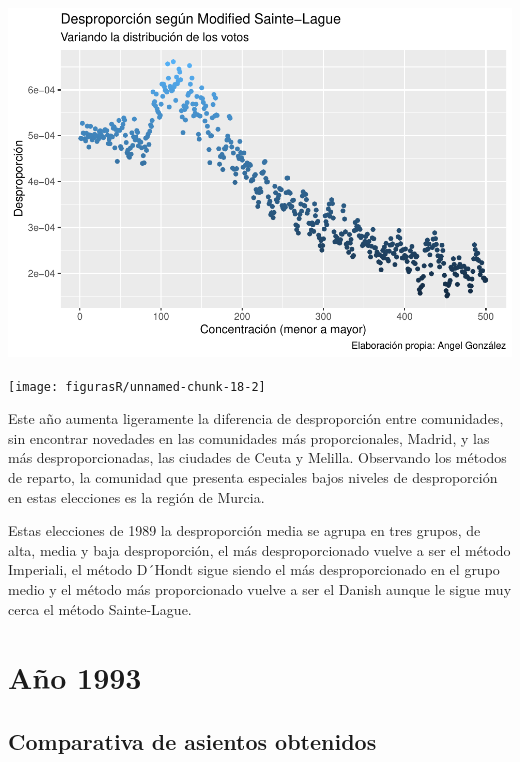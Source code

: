 \documentclass[12pt,a4paper,]{book}
\numberwithin{dummy}{section}
\theoremstyle{ocrenumbox}
\theoremstyle{blacknumex}
\theoremstyle{blacknumbox}
\theoremstyle{ocrenum}
\theoremstyle{ocrenum}
\begin{document}
\begin{center}\includegraphics[width=1\linewidth]{figurasR/unnamed-chunk-18-1} \end{center}

\begin{center}\texttt{[image: figurasR/unnamed-chunk-18-2]} \end{center}

Este año aumenta ligeramente la diferencia de desproporción entre
comunidades, sin encontrar novedades en las comunidades más
proporcionales, Madrid, y las más desproporcionadas, las ciudades de
Ceuta y Melilla. Observando los métodos de reparto, la comunidad que
presenta especiales bajos niveles de desproporción en estas elecciones
es la región de Murcia.

Estas elecciones de 1989 la desproporción media se agrupa en tres
grupos, de alta, media y baja desproporción, el más desproporcionado
vuelve a ser el método Imperiali, el método D´Hondt sigue siendo el más
desproporcionado en el grupo medio y el método más proporcionado vuelve
a ser el Danish aunque le sigue muy cerca el método Sainte-Lague.

\hypertarget{auxf1o-1993}{%
\section{Año 1993}\label{auxf1o-1993}}

\hypertarget{comparativa-de-asientos-obtenidos-5}{%
\subsection{Comparativa de asientos
obtenidos}\label{comparativa-de-asientos-obtenidos-5}}
\end{document}
